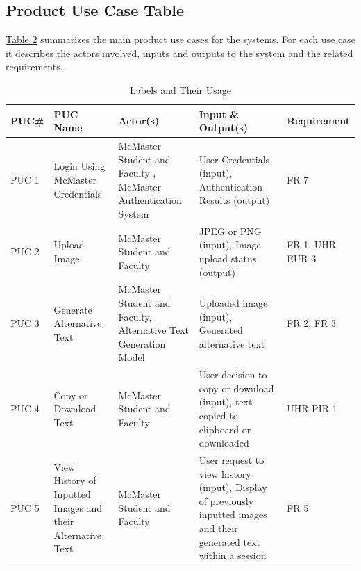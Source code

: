 \documentclass[12pt]{article}
\begin{document}
\subsection{Product Use Case Table}
\href{tab:product-use}{Table 2} summarizes the main product use cases
for the systems. For each use case it describes the actors involved,
inputs and outputs to the system and the related requirements.
\label{tab:product-use}
\begin{table}[H]
  \centering
  \caption{Labels and Their Usage}
  \begin{tabular}{|p{1.3cm}|p{2.5cm}|p{3cm}|p{4cm}|p{2.6cm}|}
    \hline
    \textbf{PUC\#} & \textbf{PUC Name} & \textbf{Actor(s)} &
    \textbf{Input \& Output(s)} & \textbf{Requirement} \\
    \hline
    PUC 1 & Login Using McMaster Credentials &  McMaster Student and
    Faculty , McMaster Authentication System & User Credentials
    (input), Authentication Results (output) & FR 7 \\
    \hline
    PUC 2 & Upload Image & McMaster Student and Faculty & JPEG or PNG
    (input), Image upload status (output) & FR 1, UHR-EUR 3 \\
    \hline
    PUC 3 & Generate Alternative Text &  McMaster Student and
    Faculty, Alternative Text Generation Model & Uploaded image
    (input), Generated alternative text  & FR 2, FR 3\\
    \hline
    PUC 4 & Copy or Download Text & McMaster Student and Faculty &
    User decision to copy or download (input), text copied to
    clipboard or downloaded & UHR-PIR 1\\
    \hline
    PUC 5 & View History of Inputted Images and their Alternative
    Text & McMaster Student and Faculty & User request to view
    history (input), Display of previously inputted images and their
    generated text within a session & FR 5\\
    \hline
  \end{tabular}
\end{table}
\end{document}
